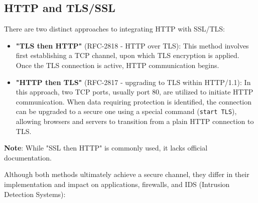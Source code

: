 \subsection{HTTP and TLS/SSL}

There are two distinct approaches to integrating HTTP with SSL/TLS:
\begin{itemize}
    \item \textbf{"TLS then HTTP"} (RFC-2818 - HTTP over TLS): This method involves first establishing a TCP channel, upon which TLS encryption is applied. Once the TLS connection is active, HTTP communication begins.

    \item \textbf{"HTTP then TLS"} (RFC-2817 - upgrading to TLS within HTTP/1.1): In this approach, two TCP ports, usually port 80, are utilized to initiate HTTP communication. When data requiring protection is identified, the connection can be upgraded to a secure one using a special command (\texttt{start TLS}), allowing browsers and servers to transition from a plain HTTP connection to TLS.
\end{itemize}
\textbf{Note}: While "SSL then HTTP" is commonly used, it lacks official documentation.


Although both methods ultimately achieve a secure channel, they differ in their implementation and impact on applications, firewalls, and IDS (Intrusion Detection Systems):

